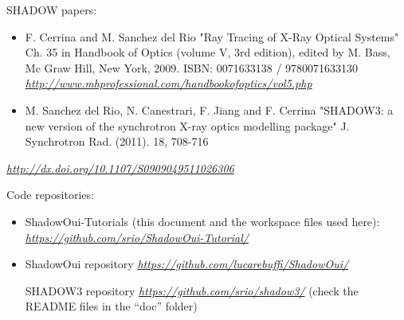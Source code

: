 \documentclass[]{article}
\providecommand{\tightlist}{%
  \setlength{\itemsep}{0pt}\setlength{\parskip}{0pt}}
\begin{document}
SHADOW papers:

\begin{itemize}
\tightlist
\item
  F. Cerrina and M. Sanchez del Rio "Ray Tracing of X-Ray Optical
  Systems" Ch. 35 in Handbook of Optics (volume V, 3rd edition), edited
  by M. Bass, Mc Graw Hill, New York, 2009. ISBN: 0071633138 /
  9780071633130
  \href{http://www.mhprofessional.com/handbookofoptics/vol5.php\%20}{\emph{http://www.mhprofessional.com/handbookofoptics/vol5.php}}
\item
  M. Sanchez del Rio, N. Canestrari, F. Jiang and F. Cerrina "SHADOW3: a
  new version of the synchrotron X-ray optics modelling package" J.
  Synchrotron Rad. (2011). 18, 708-716
\end{itemize}

\href{http://dx.doi.org/10.1107/S0909049511026306\%20}{\emph{http://dx.doi.org/10.1107/S0909049511026306}}

Code repositories:

\begin{itemize}
\item
  ShadowOui-Tutorials (this document and the workspace files used here):
  \href{https://forge.epn-campus.eu/projects/shadow3/}{\emph{\emph{https://github.com/srio/ShadowOui-Tutorial/}}}
\item
  ShadowOui repository
  \href{https://github.com/srio/shadow3/}{\emph{https://github.com/lucarebuffi/ShadowOui/}}

  SHADOW3 repository
  \href{https://github.com/srio/shadow3/}{\emph{https://github.com/srio/shadow3/}}
  (check the README files in the ``doc'' folder) 
\end{itemize}
\end{document}
